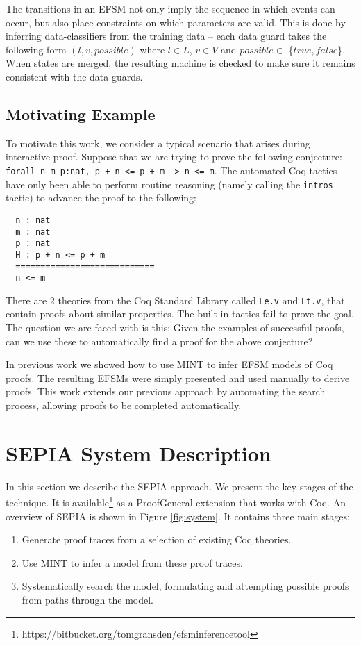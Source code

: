 \documentclass{llncs}
\begin{document}
The transitions in an EFSM not only imply the sequence in which events can occur, but also place constraints on which parameters are valid. This is done by inferring data-classifiers from the training data -- each data guard takes the following form $(l,v,possible)$ where $l \in L$, $v \in V$ and $possible \in$ \{$true, false$\}. When states are merged, the resulting machine is checked to make sure it remains consistent with the data guards.

\subsection{Motivating Example}
To motivate this work, we consider a typical scenario that arises during interactive proof. Suppose that we are trying to prove the following conjecture: \texttt{forall n m p:nat, p + n <= p + m -> n <= m}. The automated Coq tactics \cite{BC04} have only been able to perform routine reasoning (namely calling the \texttt{intros} tactic) to advance the proof to the following:

\begin{lstlisting}
  n : nat
  m : nat
  p : nat
  H : p + n <= p + m
  ============================
  n <= m
\end{lstlisting}
 


There are 2 theories from the Coq Standard Library called \texttt{Le.v} and \texttt{Lt.v}, that contain proofs about similar properties. The built-in tactics fail to prove the goal. The question we are faced with is this: Given the examples of successful proofs, can we use these to automatically find a proof for the above conjecture? 

In previous work \cite{GransdenCICM} we showed how to use MINT to infer EFSM models of Coq proofs. The resulting EFSMs were simply presented and used manually to derive proofs. This work extends our previous approach by automating the search process, allowing proofs to be completed automatically.

\section{SEPIA System Description}
\label{sec:implementation}
In this section we describe the SEPIA approach. We present the key stages of the technique. It is available\footnote{https://bitbucket.org/tomgransden/efsminferencetool} as a ProofGeneral extension that works with Coq. An overview of SEPIA is shown in Figure \ref{fig:system}. It contains three main stages:
\begin{enumerate}
\item{Generate proof traces from a selection of existing Coq theories.}
\item{Use MINT to infer a model from these proof traces.}
\item{Systematically search the model, formulating and attempting possible proofs from paths through the model.}
\end{enumerate}
\end{document}
